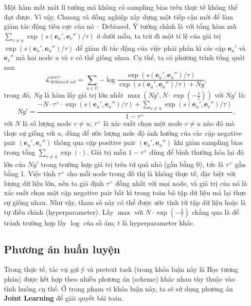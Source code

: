 Một hàm mất mát lí tưởng mà không có sampling bias trên thực tế không thể đạt được. Vì vậy, Chuang và đồng nghiệp xây dựng một tiếp cận mới để làm giảm tác động tiêu cực của nó -- Debiased. Ý tưởng chính là với tổng hàm mũ $\sum_{v \neq u}{\exp(s(\mathbf{e}_u', \mathbf{e}_v'') / \tau)}$ ở dưới mẫu, ta trừ đi một tỉ lệ của giá trị $\exp(s(\mathbf{e}_u', \mathbf{e}_u'') / \tau)$ để giảm đi tác động của việc phải phân kì các cặp $\mathbf{e}_u'$ và $\mathbf{e}_v''$ mà hai node $u$ và $v$ có thể giống nhau. Cụ thể, ta có phương trình tổng quát sau:
\begin{equation}
    \mathcal{L}_\textit{debiased ssl}^\textit{user} = \sum_{u \in U}{-\log{\frac{\exp(s(\mathbf{e}_u', \mathbf{e}_u'') / \tau)}{\exp(s(\mathbf{e}_u', \mathbf{e}_u'') / \tau) + \textit{Ng}}}},
\end{equation}
trong đó, $\textit{Ng}$ là hàm lấy giá trị lớn nhất $\max(\textit{Ng}', N \cdot \exp(-\frac{1}{t}))$ với $\textit{Ng}'$ là:
\begin{equation}
    \textit{Ng}' = \frac{-N \cdot \tau^+ \cdot \exp(s(\mathbf{e}_u', \mathbf{e}_u'') / \tau) + \sum_{v \neq u}{\exp(s(\mathbf{e}_u', \mathbf{e}_v'') / \tau)}}{1 - \tau^+},
\end{equation}
với $N$ là số lượng node $v \neq u$; $\tau^+$ là xác suất chọn một node $v \neq u$ nào đó mà thực sự giống với $u$, dùng để ước lượng mức độ ảnh hưởng của các cặp negative pair $(\mathbf{e}_u', \mathbf{e}_v'')$ thông qua cặp positive pair $(\mathbf{e}_u', \mathbf{e}_u'')$ khi giảm sampling bias trong tổng $\sum_{v \neq u}{\exp(\cdot)}$. Giá trị mẫu $1 - \tau^+$ dùng để bình thường hóa lại độ lớn của $\textit{Ng}'$ trong trường hợp giá trị trên tử quá nhỏ (gần bằng 0), tức là $\tau^+$ gần bằng 1. Việc tính $\tau^+$ cho mỗi node trong đồ thị là không thực tế, đặc biệt với lượng dữ liệu lớn, nên ta giả định $\tau^+$ đồng nhất với mọi node, và giá trị của nó là xác suất chọn một cặp negative pair bất kì trong toàn bộ tập dữ liệu mà lại thực sự giống nhau. Như vậy, tham số này có thể được ước tính từ tập dữ liệu hoặc là tự điều chỉnh (hyperparameter). Lấy $\max$ với $N \cdot \exp(-\frac{1}{t})$ chẳng qua là để tránh trường hợp lấy $\log$ của số âm; $t$ là hyperparameter khác.


\subsection{Phương án huấn luyện}
\noindent Trong thực tế, tác vụ gợi ý và pretext task (trong khóa luận này là Học tương phản) được kết hợp theo nhiều phương án (scheme) khác nhau tùy thuộc vào tình huống cụ thể. Ở trong phạm vi khóa luận này, ta sẽ sử dụng phương án \textbf{Joint Learning} \cite{survey:ssl-for-rec-sys} để giải quyết bài toán. 

